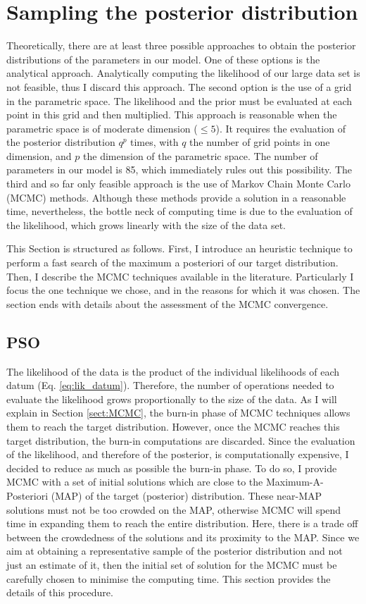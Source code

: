 \section{Sampling the posterior distribution}

Theoretically, there are at least three possible approaches to obtain the posterior distributions of the parameters in our model. One of these options is the analytical approach. Analytically computing the likelihood of our large data set is not feasible, thus I discard this approach. The second option is the use of a grid in the parametric space. The likelihood and the prior must be evaluated at each point in this grid and then multiplied. This approach is reasonable when the parametric space is of moderate dimension ($\leq 5$). It requires the evaluation of the posterior distribution $q^p$ times, with $q$ the number of grid points in one dimension, and $p$ the dimension of the parametric space. The number of parameters in our model is 85, which immediately rules out this possibility. The third and so far only feasible approach is the use of Markov Chain Monte Carlo (MCMC) methods. Although these methods provide a solution in a reasonable time, nevertheless, the bottle neck of computing time is due to the evaluation of the likelihood, which grows linearly with the size of the data set. 

This Section is structured as follows. First, I introduce an heuristic technique to perform a fast search of the maximum a posteriori of our target distribution. Then, I describe the MCMC techniques available in the literature. Particularly I focus the one technique we chose, and in the reasons for which it was chosen. The section ends with details about the assessment of the MCMC convergence.

\subsection{PSO}

The likelihood of the data is the product of the individual likelihoods of each datum (Eq. \ref{eq:lik_datum}). Therefore, the number of operations needed to evaluate the likelihood grows proportionally to the size of the data. As I will explain in Section \ref{sect:MCMC}, the burn-in phase of MCMC techniques allows them to reach the target distribution. However, once the MCMC reaches this target distribution, the burn-in computations are discarded. Since the evaluation of the likelihood, and therefore of the posterior, is computationally expensive, I decided to reduce as much as possible the burn-in phase. To do so, I provide MCMC with a set of initial solutions which are close to the Maximum-A-Posteriori (MAP) of the target (posterior) distribution. These near-MAP solutions must not be too crowded on the MAP, otherwise MCMC will spend time in expanding them to reach the entire distribution. Here, there is a trade off between the crowdedness of the solutions and its proximity to the MAP. Since we aim at obtaining a representative sample of the posterior distribution and not just an estimate of it, then the initial set of solution for the MCMC must be carefully chosen to minimise the computing time. This section provides the details of this procedure. 

